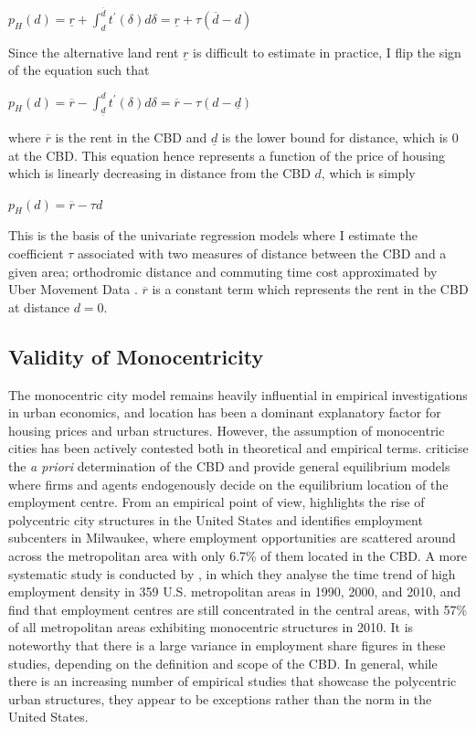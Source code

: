 \documentclass{article}
\begin{document}
\begin{center}
$p _ { H } ( d ) = \underline { r } + \int _ { d } ^ { \overline { d } } t ^ { \prime } ( \delta ) d \delta = \underline { r } + \tau ( \overline { d } - d )$
\end{center}
Since the alternative land rent $\underline{r}$ is difficult to estimate in practice, I flip the sign of the equation such that 
\begin{center}
$p _ { H } ( d ) = \overline { r } - \int _ { \underline { d } } ^ { d } t ^ { \prime } ( \delta ) d \delta = \overline { r } - \tau ( d - \underline { d } )$
\end{center}
where $\overline{r}$ is the rent in the CBD and $\underline{d}$ is the lower bound for distance, which is 0 at the CBD. This equation hence represents a function of the price of housing which is linearly decreasing in distance from the CBD $d$, which is simply
\begin{center}
$p _ { H } ( d ) = \overline { r } - \tau d$
\end{center}
This is the basis of the univariate regression models where I estimate the coefficient $\tau$ associated with two measures of distance between the CBD and a given area; orthodromic distance and commuting time cost approximated by Uber Movement Data \citep{UberMovement2019MovementCities}. $\overline{r}$ is a constant term which represents the rent in the CBD at distance $d = 0$.

\subsection{Validity of Monocentricity} \label{subsection:monocentricity}
The monocentric city model remains heavily influential in empirical investigations in urban economics, and location has been a dominant explanatory factor for housing prices and urban structures. However, the assumption of monocentric cities has been actively contested both in theoretical and empirical terms. \citet{RePEc:eee:regeco:v:12:y:1982:i:2:p:161-196} criticise the \textit{a priori} determination of the CBD and provide general equilibrium models where firms and agents endogenously decide on the equilibrium location of the employment centre.
From an empirical point of view, \citet{McMillen2001PolycentricMilwaukee.} highlights the rise of polycentric city structures in the United States and identifies employment subcenters in Milwaukee, where employment opportunities are scattered around across the metropolitan area with only 6.7\% of them located in the CBD. A more systematic study is conducted by \citet{Arribas-Bel2014The2010}, in which they analyse the time trend of high employment density in 359 U.S. metropolitan areas in 1990, 2000, and 2010, and find that employment centres are still concentrated in the central areas, with 57\% of all metropolitan areas exhibiting monocentric structures in 2010. It is noteworthy that there is a large variance in employment share figures in these studies, depending on the definition and scope of the CBD. In general, while there is an increasing number of empirical studies that showcase the polycentric urban structures, they appear to be exceptions rather than the norm in the United States.
\end{document}
